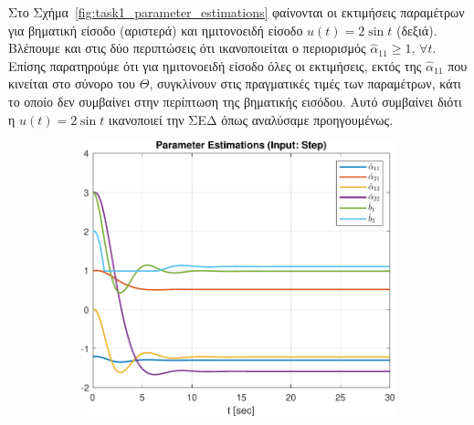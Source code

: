 \documentclass[a4paper,12pt]{article}
\begin{document}
Στο Σχήμα~\ref{fig:task1_parameter_estimations} φαίνονται οι εκτιμήσεις παραμέτρων για βηματική είσοδο
(αριστερά) και ημιτονοειδή είσοδο $u(t) = 2 \sin t$ (δεξιά). Βλέπουμε και στις δύο περιπτώσεις ότι
ικανοποιείται ο περιορισμός $\hat{\alpha}_{11} \geq 1, \, \forall t$. Επίσης παρατηρούμε ότι για ημιτονοειδή
είσοδο όλες οι εκτιμήσεις, εκτός της $\hat{\alpha}_{11}$ που κινείται στο σύνορο του $\Theta$, συγκλίνουν
στις πραγματικές τιμές των παραμέτρων, κάτι το οποίο δεν συμβαίνει στην περίπτωση της βηματικής εισόδου.
Αυτό συμβαίνει διότι η $u(t) = 2 \sin t$ ικανοποιεί την ΣΕΔ όπως αναλύσαμε προηγουμένως.

\begin{figure}[htbp]
  \centering
  \begin{subfigure}[b]{0.45\textwidth}
    \centering
    \includegraphics[width=\textwidth]{plot/task1_parameter_estimations_step.pdf}
    \caption{}
    \label{fig:task1_parameter_estimations_step}
  \end{subfigure}
  \hfill
  \begin{subfigure}[b]{0.45\textwidth}
    \centering

\end{subfigure}
\end{figure}
\end{document}
